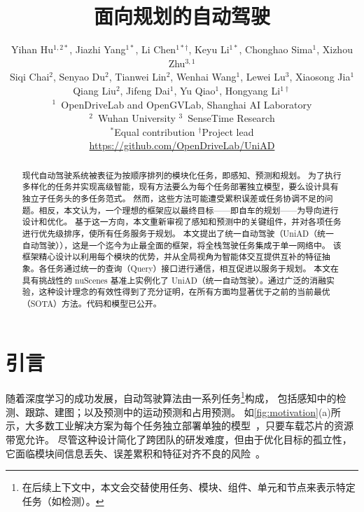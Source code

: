 \documentclass[10pt,twocolumn,letterpaper]{article}
\begin{document}
\title{
面向规划的自动驾驶
}


\author{
Yihan Hu$^{1,2\ast}$,
Jiazhi Yang$^{1\ast}$,
Li Chen$^{1\ast \dagger}$,
Keyu Li$^{1\ast}$,
Chonghao Sima$^1$,
Xizhou Zhu$^{3,1}$ \\
Siqi Chai$^2$,
Senyao Du$^2$,
Tianwei Lin$^2$,
Wenhai Wang$^1$,
Lewei Lu$^3$,
Xiaosong Jia$^{1}$ \\
Qiang Liu$^2$,
Jifeng Dai$^1$,
Yu Qiao$^1$,
Hongyang Li$^{1\dagger}$ \\
[2mm]
$^1$~OpenDriveLab and OpenGVLab, Shanghai AI Laboratory \\ 
$^2$~Wuhan University \quad
$^3$~SenseTime Research
\\ 
\normalsize{
$^\ast$Equal contribution \quad $^\dagger$Project lead}
\\
\normalsize{
\url{https://github.com/OpenDriveLab/UniAD}
}
}


\maketitle


\begin{abstract}

现代自动驾驶系统被表征为按顺序排列的模块化任务，即感知、预测和规划。
%
为了执行多样化的任务并实现高级智能，现有方法要么为每个任务部署独立模型，要么设计具有独立子任务头的多任务范式。
%
然而，这些方法可能遭受累积误差或任务协调不足的问题。相反，本文认为，一个理想的框架应以最终目标——即自车的规划——为导向进行设计和优化。
%
基于这一方向，本文重新审视了感知和预测中的关键组件，并对各项任务进行优先级排序，使所有任务服务于规划。
%
本文提出了统一自动驾驶（UniAD（统一自动驾驶）），这是一个迄今为止最全面的框架，将全栈驾驶任务集成于单一网络中。
%
该框架精心设计以利用每个模块的优势，并从全局视角为智能体交互提供互补的特征抽象。各任务通过统一的查询（Query）接口进行通信，相互促进以服务于规划。
%
本文在具有挑战性的 nuScenes 基准上实例化了 UniAD（统一自动驾驶）。通过广泛的消融实验，这种设计理念的有效性得到了充分证明，在所有方面均显著优于之前的当前最优（SOTA）方法。代码和模型已公开。
\end{abstract}

\section{引言}
\label{sec:intro}
\vspace{-4pt}
随着深度学习的成功发展，自动驾驶算法由一系列任务\footnote{在后续上下文中，本文会交替使用任务、模块、组件、单元和节点来表示特定任务（如检测）。}构成，
包括感知中的检测、跟踪、建图；以及预测中的运动预测和占用预测。
%
如\cref{fig:motivation}(a)所示，大多数工业解决方案为每个任务独立部署单独的模型~\cite{mobileye2022ces,nvidia2022drive}，只要车载芯片的资源带宽允许。
%
尽管这种设计简化了跨团队的研发难度，但由于优化目标的孤立性，它面临模块间信息丢失、误差累积和特征对齐不良的风险~\cite{luo2018faf,liang2020pnpnet,sadat2020p3}。
\end{document}
